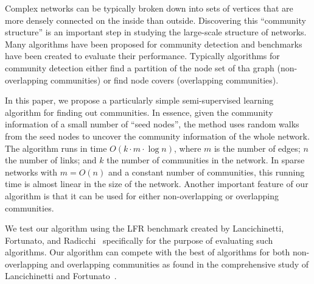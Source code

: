 Complex networks can be typically broken down into sets of vertices that are
more densely connected on the inside than outside. Discovering this ``community
structure'' is an important step in studying the large-scale structure of
networks. Many algorithms have been proposed for community detection and
benchmarks have been created to evaluate their performance. Typically algorithms
for community detection either find a partition of the node set of tha graph 
(non-overlapping communities) or find node covers (overlapping communities). 

In this paper, we propose a particularly simple semi-supervised learning
algorithm for finding out communities. In essence, given the community
information of a small number of ``seed nodes'', the method uses random walks
from the seed nodes to uncover the community information of the whole network.
The algorithm runs in time $O(k \cdot m \cdot \log n)$, where $m$ is the number
of edges; $n$ the number of links; and $k$ the number of communities in the
network.  In sparse networks with $m = O(n)$ and a constant number of
communities, this running time is almost linear in the size of the network.
Another important feature of our algorithm is that it can be used for either
non-overlapping or overlapping communities. 

We test our algorithm using the LFR benchmark created by Lancichinetti,
Fortunato, and Radicchi~\cite{LFR08} specifically for the purpose of evaluating
such algorithms. Our algorithm can compete with the best of algorithms for both
non-overlapping and overlapping communities as found in the comprehensive study
of Lancichinetti and Fortunato~\cite{LF09}.
